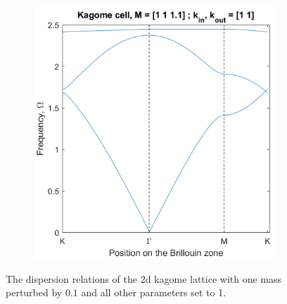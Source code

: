 \begin{figure}[!h]
\begin{subfigure}[b]{.33\textwidth}
\end{subfigure}%
\begin{subfigure}[b]{.33\textwidth}
  \centering
  \includegraphics[width=1\linewidth]{imgs/kagomebs3.png}
\end{subfigure}%
\caption{\label{fig:kagomebreaksym} The dispersion relations of the 2d kagome
  lattice with one mass perturbed by $0.1$ and all other parameters set to 1.}
\end{figure}

